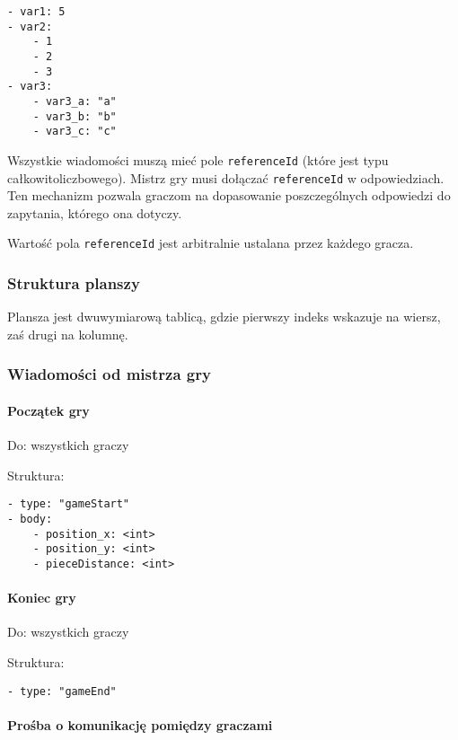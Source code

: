 \documentclass[a4paper]{article}
\newcommand{\code}{\texttt}
\begin{document}
\begin{verbatim}
- var1: 5
- var2:
    - 1
    - 2
    - 3
- var3:
    - var3_a: "a"
    - var3_b: "b"
    - var3_c: "c"
\end{verbatim}

Wszystkie wiadomości muszą mieć pole \code{referenceId} (które jest typu całkowitoliczbowego).
Mistrz gry musi dołączać \code{referenceId} w odpowiedziach.
Ten mechanizm pozwala graczom na dopasowanie poszczególnych odpowiedzi do zapytania, którego ona dotyczy.

Wartość pola \code{referenceId} jest arbitralnie ustalana przez każdego gracza.

\subsubsection{Struktura planszy}

Plansza jest dwuwymiarową tablicą, gdzie pierwszy indeks wskazuje na wiersz, zaś drugi na kolumnę.

\subsubsection{Wiadomości od mistrza gry}

\paragraph{Początek gry}
\hfill
\hfill

Do: wszystkich graczy

Struktura:

\begin{verbatim}
- type: "gameStart"
- body:
    - position_x: <int>
    - position_y: <int>
    - pieceDistance: <int>
\end{verbatim}

\paragraph{Koniec gry}
\hfill

Do: wszystkich graczy

Struktura:

\begin{verbatim}
- type: "gameEnd"
\end{verbatim}

\paragraph{Prośba o komunikację pomiędzy graczami}
\hfill
\end{document}
